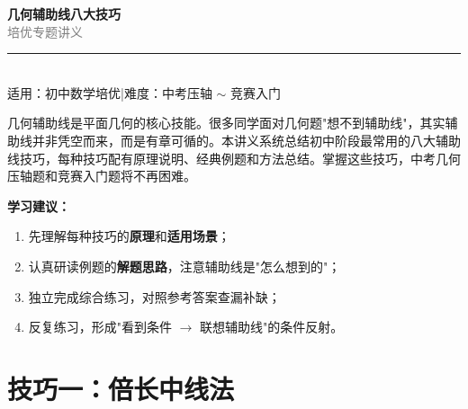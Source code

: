 \documentclass[12pt, a4paper]{ctexart}
\begin{document}
\begin{center}
{\Huge\bfseries\textcolor{mainblue}{几何辅助线八大技巧}}\\[12pt]
{\Large\textcolor{gray}{培优专题讲义}}\\[8pt]
\rule{0.6\textwidth}{1pt}\\[8pt]
{\normalsize 适用：初中数学培优\quad |\quad 难度：中考压轴 \(\sim\) 竞赛入门}
\end{center}
\vspace{6pt}

\begin{knowledgebox}[写在前面]
几何辅助线是平面几何的核心技能。很多同学面对几何题"想不到辅助线"，其实辅助线并非凭空而来，而是有章可循的。本讲义系统总结初中阶段最常用的八大辅助线技巧，每种技巧配有原理说明、经典例题和方法总结。掌握这些技巧，中考几何压轴题和竞赛入门题将不再困难。

\medskip
\noindent\textbf{学习建议：}
\begin{enumerate}[leftmargin=2em]
  \item 先理解每种技巧的\textbf{原理}和\textbf{适用场景}；
  \item 认真研读例题的\textbf{解题思路}，注意辅助线是"怎么想到的"；
  \item 独立完成综合练习，对照参考答案查漏补缺；
  \item 反复练习，形成"看到条件 \(\to\) 联想辅助线"的条件反射。
\end{enumerate}
\end{knowledgebox}

\vspace{4pt}

\section*{\textcolor{mainblue}{技巧一：倍长中线法}}
\end{document}
